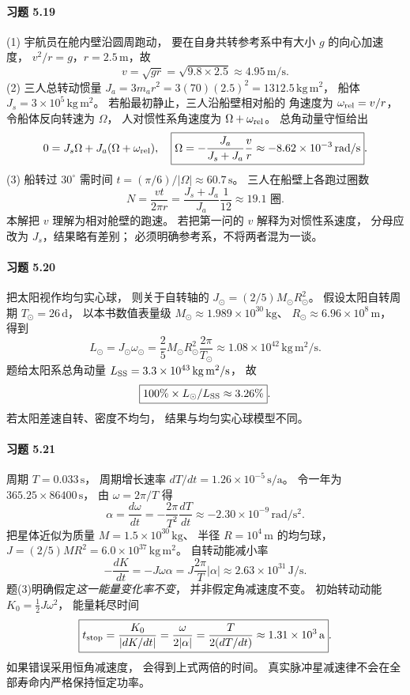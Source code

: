 \paragraph{习题 5.19}
(1) 宇航员在舱内壁沿圆周跑动，
要在自身共转参考系中有大小 \(g\) 的向心加速度，
\(v^2/r=g\)，\(r=2.5\,\mathrm m\)，故
\[
 \boxed{v=\sqrt{gr}=\sqrt{9.8\times2.5}
 \approx4.95\,\mathrm{m/s}}.
\]
(2) 三人总转动惯量
\(J_a=3m_ar^2=3(70)(2.5)^2
 =1312.5\,\mathrm{kg\,m^2}\)，
船体 \(J_s=3\times10^5\,\mathrm{kg\,m^2}\)。
若船最初静止，三人沿船壁相对船的
角速度为 \(\omega_{\rm rel}=v/r\)，
令船体反向转速为 \(\Omega\)，
人对惯性系角速度为
\(\Omega+\omega_{\rm rel}\)。
总角动量守恒给出
\[
 0=J_s\Omega+J_a(\Omega+\omega_{\rm rel}),
\quad
 \boxed{\Omega=-\frac{J_a}{J_s+J_a}\frac vr
 \approx-8.62\times10^{-3}\,\mathrm{rad/s}}.
\]
(3) 船转过 \(30^\circ\) 需时间
\(t=(\pi/6)/|\Omega|\approx60.7\,\mathrm s\)。
三人在船壁上各跑过圈数
\[
 \boxed{N=\frac{vt}{2\pi r}
 =\frac{J_s+J_a}{J_a}\frac{1}{12}
 \approx19.1\text{ 圈}}.
\]
本解把 \(v\) 理解为相对舱壁的跑速。
若把第一问的 \(v\) 解释为对惯性系速度，
分母应改为 \(J_s\)，结果略有差别；
必须明确参考系，不将两者混为一谈。

\paragraph{习题 5.20}
把太阳视作均匀实心球，
则关于自转轴的
\(J_\odot=(2/5)M_\odot R_\odot^2\)。
假设太阳自转周期 \(T_\odot=26\,\mathrm d\)，
以本书数值表量级
\(M_\odot\approx1.989\times10^{30}\,\mathrm{kg}\)、
\(R_\odot\approx6.96\times10^8\,\mathrm m\)，
得到
\[
 \boxed{L_\odot=J_\odot\omega_\odot
 =\frac25M_\odot R_\odot^2
 \frac{2\pi}{T_\odot}
 \approx1.08\times10^{42}\,\mathrm{kg\,m^2/s}}.
\]
题给太阳系总角动量
\(L_{\rm SS}=3.3\times10^{43}\,\mathrm{kg\,m^2/s}\)，
故
\[
 \boxed{100\%\times L_\odot/L_{\rm SS}\approx3.26\%}.
\]
若太阳差速自转、密度不均匀，
结果与均匀实心球模型不同。

\paragraph{习题 5.21}
周期 \(T=0.033\,\mathrm s\)，
周期增长速率
\(dT/dt=1.26\times10^{-5}\,\mathrm{s/a}\)。
令一年为 \(365.25\times86400\,\mathrm s\)，
由 \(\omega=2\pi/T\) 得
\[
 \boxed{\alpha=\frac{d\omega}{dt}
 =-\frac{2\pi}{T^2}\frac{dT}{dt}
 \approx-2.30\times10^{-9}\,\mathrm{rad/s^2}}.
\]
把星体近似为质量
\(M=1.5\times10^{30}\,\mathrm{kg}\)、
半径 \(R=10^4\,\mathrm m\) 的均匀球，
\(J=(2/5)MR^2
 =6.0\times10^{37}\,\mathrm{kg\,m^2}\)。
自转动能减小率
\[
 \boxed{-\frac{dK}{dt}
 =-J\omega\alpha
 =J\frac{2\pi}{T}|\alpha|
 \approx2.63\times10^{31}\,\mathrm{J/s}}.
\]
题(3)明确假定\emph{这一能量变化率不变}，
并非假定角减速度不变。
初始转动动能
\(K_0=\tfrac12J\omega^2\)，
能量耗尽时间
\[
 \boxed{t_{\rm stop}=\frac{K_0}{|dK/dt|}
 =\frac{\omega}{2|\alpha|}
 =\frac{T}{2(dT/dt)}
 \approx1.31\times10^3\,\mathrm a}.
\]
如果错误采用恒角减速度，
会得到上式两倍的时间。
真实脉冲星减速律不会在全部寿命内严格保持恒定功率。

